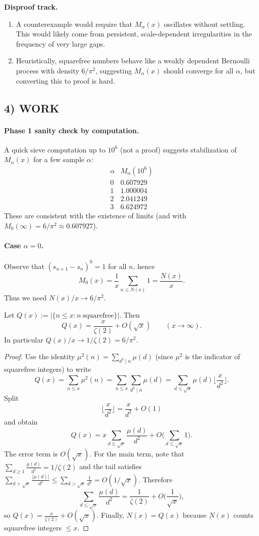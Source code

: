 \textbf{Disproof track.}
\begin{enumerate}
\item A counterexample would require that $M_{\alpha}(x)$ oscillates without settling. This would likely come from persistent, scale-dependent irregularities in the frequency of very large gaps.
\item Heuristically, squarefree numbers behave like a weakly dependent Bernoulli process with density $6/\pi^2$, suggesting $M_{\alpha}(x)$ should converge for all $\alpha$, but converting this to proof is hard.
\end{enumerate}

\subsection*{4) WORK}
\paragraph{Phase 1 sanity check by computation.}
A quick sieve computation up to $10^6$ (not a proof) suggests stabilization of $M_{\alpha}(x)$ for a few sample $\alpha$:
\[
\begin{array}{c|c}
\alpha & M_{\alpha}(10^6)\\ \hline
0 & 0.607929\\
1 & 1.000004\\
2 & 2.041249\\
3 & 6.624972
\end{array}
\]
These are consistent with the existence of limits (and with $M_0(\infty)=6/\pi^2\approx0.607927$).

\paragraph{Case $\alpha=0$.}
Observe that $(s_{n+1}-s_n)^0=1$ for all $n$, hence
\[
M_0(x)=\frac{1}{x}\sum_{n\le N(x)}1=\frac{N(x)}{x}.
\]
Thus we need $N(x)/x\to 6/\pi^2$.

\begin{lemma}
\label{lem:145-squarefreecount}
Let $Q(x):=|\{n\le x: n\ \text{squarefree}\}|$. Then
\[
Q(x)=\frac{x}{\zeta(2)}+O(\sqrt{x})
\qquad (x\to\infty).
\]
In particular $Q(x)/x\to 1/\zeta(2)=6/\pi^2$.
\end{lemma}
\begin{proof}
Use the identity $\mu^2(n)=\sum_{d^2\mid n}\mu(d)$ (since $\mu^2$ is the indicator of squarefree integers) to write
\[
Q(x)=\sum_{n\le x}\mu^2(n)=\sum_{n\le x}\sum_{d^2\mid n}\mu(d)=\sum_{d\le \sqrt{x}}\mu(d)\Big\lfloor \frac{x}{d^2}\Big\rfloor.
\]
Split
\[
\Big\lfloor \frac{x}{d^2}\Big\rfloor=\frac{x}{d^2}+O(1)
\]
and obtain
\[
Q(x)=x\sum_{d\le\sqrt{x}}\frac{\mu(d)}{d^2}+O\Big(\sum_{d\le\sqrt{x}}1\Big).
\]
The error term is $O(\sqrt{x})$. For the main term, note that $\sum_{d\ge1}\frac{\mu(d)}{d^2}=1/\zeta(2)$ and the tail satisfies $\sum_{d>\sqrt{x}}\frac{|\mu(d)|}{d^2}\le\sum_{d>\sqrt{x}}\frac1{d^2}=O(1/\sqrt{x})$. Therefore
\[
\sum_{d\le\sqrt{x}}\frac{\mu(d)}{d^2}=\frac1{\zeta(2)}+O\Big(\frac1{\sqrt{x}}\Big),
\]
so $Q(x)=\frac{x}{\zeta(2)}+O(\sqrt{x})$.
Finally, $N(x)=Q(x)$ because $N(x)$ counts squarefree integers $\le x$.
\end{proof}

